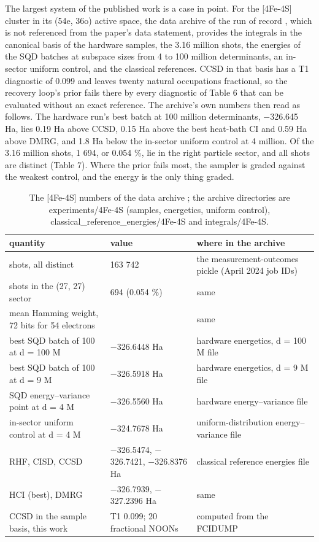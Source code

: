 \documentclass[11pt]{article}
\begin{document}
The largest system of the published work is a case in point. For the [4Fe-4S] cluster in its (54e, 36o) active space, the data archive of the run of record \cite{IBMdata}, which is not referenced from the paper's data statement, provides the integrals in the canonical basis of the hardware samples, the 3.16 million shots, the energies of the SQD batches at subspace sizes from 4 to 100 million determinants, an in-sector uniform control, and the classical references. CCSD in that basis has a T1 diagnostic of 0.099 and leaves twenty natural occupations fractional, so the recovery loop's prior fails there by every diagnostic of Table 6 that can be evaluated without an exact reference. The archive's own numbers then read as follows. The hardware run's best batch at 100 million determinants, $-$326.645 Ha, lies 0.19 Ha above CCSD, 0.15 Ha above the best heat-bath CI and 0.59 Ha above DMRG, and 1.8 Ha below the in-sector uniform control at 4 million. Of the 3.16 million shots, 1 694, or 0.054 \%, lie in the right particle sector, and all shots are distinct (Table 7). Where the prior fails most, the sampler is graded against the weakest control, and the energy is the only thing graded.


\begin{table}[htbp]
\centering
\caption{The [4Fe-4S] numbers of the data archive \cite{IBMdata}; the archive directories are experiments/4Fe-4S (samples, energetics, uniform control), classical\_reference\_energies/4Fe-4S and integrals/4Fe-4S.}\label{tab:7}
\small
\renewcommand{\arraystretch}{1.3}

\begin{tabularx}{\linewidth}{@{}>{\hsize=1.031\hsize\raggedright\arraybackslash}X>{\hsize=0.779\hsize\raggedright\arraybackslash}X>{\hsize=1.191\hsize\raggedright\arraybackslash}X@{}}
\toprule
quantity & value & where in the archive \\
\midrule
shots, all distinct & 3 163 742 & the measurement-outcomes pickle (April 2024 job IDs) \\
shots in the (27, 27) sector & 1 694 (0.054 \%) & same \\
mean Hamming weight, 72 bits for 54 electrons & 42.2 & same \\
best SQD batch of 100 at d = 100 M & $-$326.6448 Ha & hardware energetics, d = 100 M file \\
best SQD batch of 100 at d = 9 M & $-$326.5918 Ha & hardware energetics, d = 9 M file \\
SQD energy--variance point at d = 4 M & $-$326.5560 Ha & hardware energy--variance file \\
in-sector uniform control at d = 4 M & $-$324.7678 Ha & uniform-distribution energy--variance file \\
RHF, CISD, CCSD & $-$326.5474, $-$326.7421, $-$326.8376 Ha & classical reference energies file \\
HCI (best), DMRG & $-$326.7939, $-$327.2396 Ha & same \\
CCSD in the sample basis, this work & T1 0.099; 20 fractional NOONs & computed from the FCIDUMP \\
\bottomrule
\end{tabularx}
\end{table}
\end{document}

